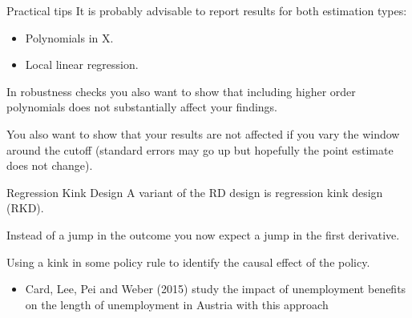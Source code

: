 \documentclass[handout]{beamer}
\begin{document}
\begin{frame}{Practical tips}
	It is probably advisable to report results for both estimation types:
	\begin{itemize}
		\item Polynomials in X.
		\item Local linear regression.
	\end{itemize}
	In robustness checks you also want to show that including higher
	order polynomials does not substantially affect your findings.\bigskip
	
	You also want to show that your results are not affected if you vary the window around the cutoff (standard errors may go up but
	hopefully the point estimate does not change).
\end{frame}

\begin{frame}{Regression Kink Design}
A variant of the RD design is regression kink design (RKD).\bigskip

Instead of a jump in the outcome you now expect a jump in the first derivative.\bigskip

Using a kink in some policy rule to identify the causal effect of the policy.
\begin{itemize}
	\item Card, Lee, Pei and Weber (2015) study the impact of unemployment benefits on the length of unemployment in Austria with this approach
\end{itemize}


\end{frame}
\end{document}
